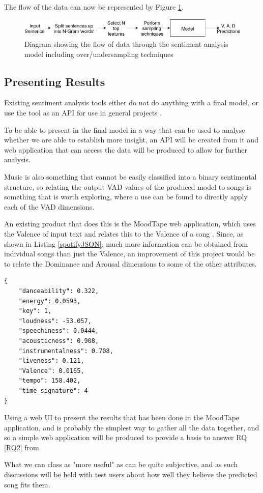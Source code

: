 The flow of the data can now be represented by Figure \ref{model:finalFlow}.

\begin{figure}[h]
\centering
\includegraphics[scale=0.5]{litImgs/finalmodelflow.png}
\caption{Diagram showing the flow of data through the sentiment analysis model including over/undersampling techniques}
\label{model:finalFlow}
\end{figure}

\subsection{Presenting Results}

Existing sentiment analysis tools either do not do anything with a final model, or use the tool as an API for use in general projects \cite{sentimentAPI}.  

To be able to present in the final model in a way that can be used to analyse whether we are able to establish more insight, an API will be created from it and web application that can access the data will be produced to allow for further analysis.

Music is also something  that cannot be easily classified into a binary sentimental structure, so relating the output VAD values of the produced model to songs is something that is worth exploring, where a use can be found to directly apply each of the VAD dimensions.

An existing product that does this is the MoodTape web application, which uses the Valence of input text and relates this to the Valence of a song  \cite{moodtape}. Since, as shown in Listing \ref{spotifyJSON}, much more information can be obtained from individual songs than just the Valence, an improvement of this project would be to relate the Dominance and Arousal dimensions to some of the other attributes.

\begin{lstlisting}[style=leftCode, caption={Some of the attributes of a song obtained through requesting information through the Spotify API},captionpos=b, label={spotifyJSON}]
{
    "danceability": 0.322,
    "energy": 0.0593,
    "key": 1,
    "loudness": -53.057,
    "speechiness": 0.0444,
    "acousticness": 0.908,
    "instrumentalness": 0.708,
    "liveness": 0.121,
    "Valence": 0.0165,
    "tempo": 158.402,
    "time_signature": 4
}
\end{lstlisting}

Using a web UI to present the results that has been done in the MoodTape application, and is probably the simplest way to gather all the data together, and so a simple web application will be produced to provide a basis to answer RQ \ref{RQ2} from.

What we can class as "more useful" as can be quite subjective, and as such discussions will be held with test users about how well they believe the predicted song fits them.